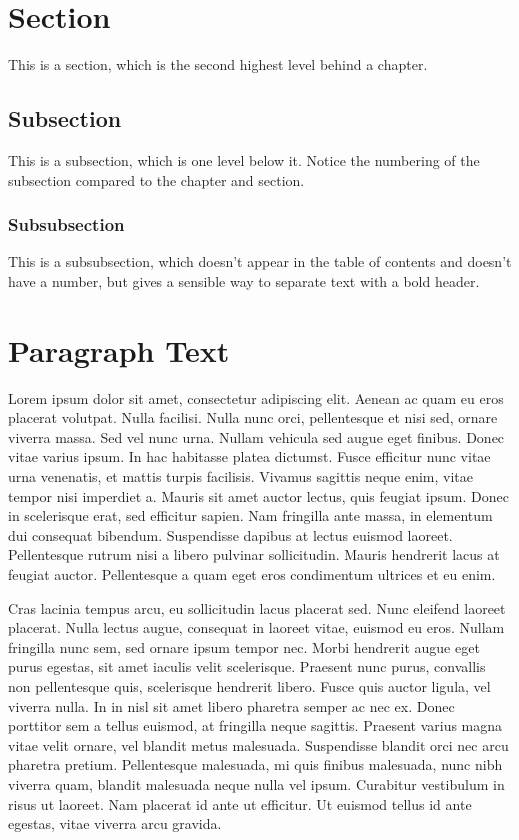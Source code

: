 
\section{Section}
This is a section, which is the second highest level behind a chapter.

\subsection{Subsection}
This is a subsection, which is one level below it. Notice the numbering of the subsection compared to the chapter and section.

\subsubsection{Subsubsection}
This is a subsubsection, which doesn't appear in the table of contents and doesn't have a number, but gives a sensible way to separate text with a bold header.

\section{Paragraph Text}

Lorem ipsum dolor sit amet, consectetur adipiscing elit. Aenean ac quam eu eros placerat volutpat. Nulla facilisi. Nulla nunc orci, pellentesque et nisi sed, ornare viverra massa. Sed vel nunc urna. Nullam vehicula sed augue eget finibus. Donec vitae varius ipsum. In hac habitasse platea dictumst. Fusce efficitur nunc vitae urna venenatis, et mattis turpis facilisis. Vivamus sagittis neque enim, vitae tempor nisi imperdiet a. Mauris sit amet auctor lectus, quis feugiat ipsum. Donec in scelerisque erat, sed efficitur sapien. Nam fringilla ante massa, in elementum dui consequat bibendum. Suspendisse dapibus at lectus euismod laoreet. Pellentesque rutrum nisi a libero pulvinar sollicitudin. Mauris hendrerit lacus at feugiat auctor. Pellentesque a quam eget eros condimentum ultrices et eu enim.

Cras lacinia tempus arcu, eu sollicitudin lacus placerat sed. Nunc eleifend laoreet placerat. Nulla lectus augue, consequat in laoreet vitae, euismod eu eros. Nullam fringilla nunc sem, sed ornare ipsum tempor nec. Morbi hendrerit augue eget purus egestas, sit amet iaculis velit scelerisque. Praesent nunc purus, convallis non pellentesque quis, scelerisque hendrerit libero. Fusce quis auctor ligula, vel viverra nulla. In in nisl sit amet libero pharetra semper ac nec ex. Donec porttitor sem a tellus euismod, at fringilla neque sagittis. Praesent varius magna vitae velit ornare, vel blandit metus malesuada. Suspendisse blandit orci nec arcu pharetra pretium. Pellentesque malesuada, mi quis finibus malesuada, nunc nibh viverra quam, blandit malesuada neque nulla vel ipsum. Curabitur vestibulum in risus ut laoreet. Nam placerat id ante ut efficitur. Ut euismod tellus id ante egestas, vitae viverra arcu gravida.


